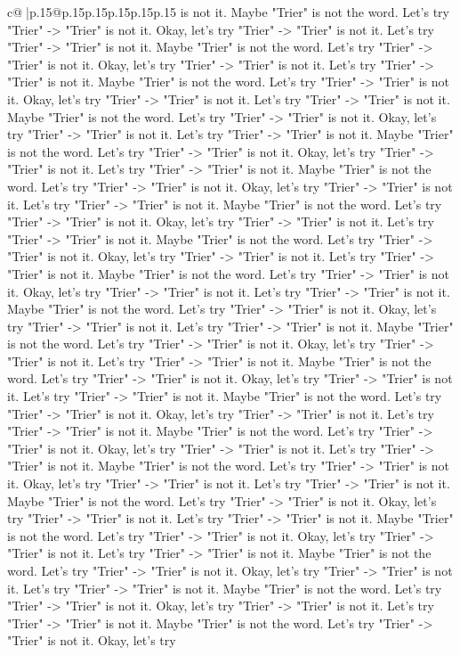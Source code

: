 \documentclass{article}
\begin{document}
{\begin{supertabular}{c@{$\;$}|p{.15\linewidth}@{}p{.15\linewidth}p{.15\linewidth}p{.15\linewidth}p{.15\linewidth}p{.15\linewidth}}
{{{is not it. Maybe "Trier" is not the word. Let's try "Trier" {-}> "Trier" is not it. Okay, let's try "Trier" {-}> "Trier" is not it. Let's try "Trier" {-}> "Trier" is not it. Maybe "Trier" is not the word. Let's try "Trier" {-}> "Trier" is not it. Okay, let's try "Trier" {-}> "Trier" is not it. Let's try "Trier" {-}> "Trier" is not it. Maybe "Trier" is not the word. Let's try "Trier" {-}> "Trier" is not it. Okay, let's try "Trier" {-}> "Trier" is not it. Let's try "Trier" {-}> "Trier" is not it. Maybe "Trier" is not the word. Let's try "Trier" {-}> "Trier" is not it. Okay, let's try "Trier" {-}> "Trier" is not it. Let's try "Trier" {-}> "Trier" is not it. Maybe "Trier" is not the word. Let's try "Trier" {-}> "Trier" is not it. Okay, let's try "Trier" {-}> "Trier" is not it. Let's try "Trier" {-}> "Trier" is not it. Maybe "Trier" is not the word. Let's try "Trier" {-}> "Trier" is not it. Okay, let's try "Trier" {-}> "Trier" is not it. Let's try "Trier" {-}> "Trier" is not it. Maybe "Trier" is not the word. Let's try "Trier" {-}> "Trier" is not it. Okay, let's try "Trier" {-}> "Trier" is not it. Let's try "Trier" {-}> "Trier" is not it. Maybe "Trier" is not the word. Let's try "Trier" {-}> "Trier" is not it. Okay, let's try "Trier" {-}> "Trier" is not it. Let's try "Trier" {-}> "Trier" is not it. Maybe "Trier" is not the word. Let's try "Trier" {-}> "Trier" is not it. Okay, let's try "Trier" {-}> "Trier" is not it. Let's try "Trier" {-}> "Trier" is not it. Maybe "Trier" is not the word. Let's try "Trier" {-}> "Trier" is not it. Okay, let's try "Trier" {-}> "Trier" is not it. Let's try "Trier" {-}> "Trier" is not it. Maybe "Trier" is not the word. Let's try "Trier" {-}> "Trier" is not it. Okay, let's try "Trier" {-}> "Trier" is not it. Let's try "Trier" {-}> "Trier" is not it. Maybe "Trier" is not the word. Let's try "Trier" {-}> "Trier" is not it. Okay, let's try "Trier" {-}> "Trier" is not it. Let's try "Trier" {-}> "Trier" is not it. Maybe "Trier" is not the word. Let's try "Trier" {-}> "Trier" is not it. Okay, let's try "Trier" {-}> "Trier" is not it. Let's try "Trier" {-}> "Trier" is not it. Maybe "Trier" is not the word. Let's try "Trier" {-}> "Trier" is not it. Okay, let's try "Trier" {-}> "Trier" is not it. Let's try "Trier" {-}> "Trier" is not it. Maybe "Trier" is not the word. Let's try "Trier" {-}> "Trier" is not it. Okay, let's try "Trier" {-}> "Trier" is not it. Let's try "Trier" {-}> "Trier" is not it. Maybe "Trier" is not the word. Let's try "Trier" {-}> "Trier" is not it. Okay, let's try "Trier" {-}> "Trier" is not it. Let's try "Trier" {-}> "Trier" is not it. Maybe "Trier" is not the word. Let's try "Trier" {-}> "Trier" is not it. Okay, let's try "Trier" {-}> "Trier" is not it. Let's try "Trier" {-}> "Trier" is not it. Maybe "Trier" is not the word. Let's try "Trier" {-}> "Trier" is not it. Okay, let's try "Trier" {-}> "Trier" is not it. Let's try "Trier" {-}> "Trier" is not it. Maybe "Trier" is not the word. Let's try "Trier" {-}> "Trier" is not it. Okay, let's try "Trier" {-}> "Trier" is not it. Let's try "Trier" {-}> "Trier" is not it. Maybe "Trier" is not the word. Let's try "Trier" {-}> "Trier" is not it. Okay, let's try }}}
\end{supertabular}}
\end{document}
